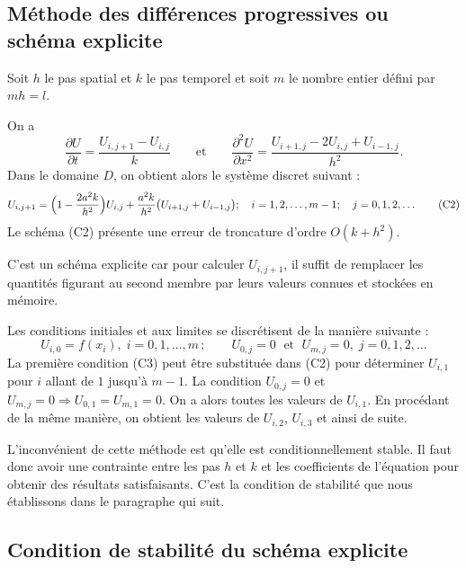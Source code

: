 \subsection{Méthode des différences progressives ou schéma explicite}

Soit $h$ le pas spatial et $k$ le pas temporel et soit $m$ le nombre entier
défini par $mh = l$.

On a
\[
  \frac{\partial U}{\partial t} = \frac{U_{i,j+1} - U_{i,j}}{k}
  \qquad\text{et}\qquad
  \frac{\partial^2 U}{\partial x^2} = \frac{U_{i+1,j} - 2U_{i,j} + U_{i-1,j}}{h^2} .
\]
Dans le domaine $D$, on obtient alors le système discret suivant :
\begin{equation}
  U_{i,j+1} = \Bigl(1 - \frac{2a^2k}{h^2}\Bigr)U_{i,j}
            + \frac{a^2k}{h^2}\bigl(U_{i+1,j} + U_{i-1,j}\bigr) ;
  \quad i = 1, 2, \dots, m-1 ; \quad j = 0, 1, 2, \dots
  \tag{C2}
\end{equation}
Le schéma (C2) présente une erreur de troncature d'ordre $O(k + h^2)$.

C'est un schéma explicite car pour calculer $U_{i,j+1}$, il suffit de
remplacer les quantités figurant au second membre par leurs valeurs connues et
stockées en mémoire.

Les conditions initiales et aux limites se discrétisent de la manière
suivante :
\begin{equation}
  U_{i,0} = f(x_i), \; i = 0, 1, \dots, m \,; \qquad
  U_{0,j} = 0 \;\text{ et }\; U_{m,j} = 0, \; j = 0, 1, 2, \dots
  \tag{C3}
\end{equation}
La première condition (C3) peut être substituée dans (C2) pour déterminer
$U_{i,1}$ pour $i$ allant de $1$ jusqu'à $m-1$. La condition $U_{0,j} = 0$ et
$U_{m,j} = 0 \Longrightarrow U_{0,1} = U_{m,1} = 0$. On a alors toutes les
valeurs de $U_{i,1}$. En procédant de la même manière, on obtient les valeurs
de $U_{i,2}$, $U_{i,3}$ et ainsi de suite.

L'inconvénient de cette méthode est qu'elle est conditionnellement stable. Il
faut donc avoir une contrainte entre les pas $h$ et $k$ et les coefficients de
l'équation pour obtenir des résultats satisfaisants. C'est la condition de
stabilité que nous établissons dans le paragraphe qui suit.

\subsection{Condition de stabilité du schéma explicite}

